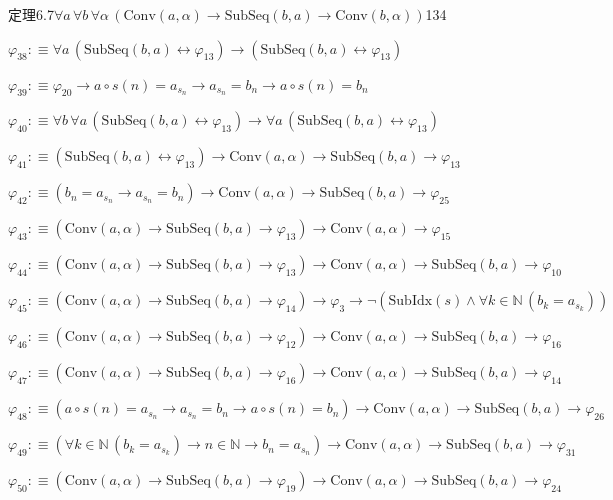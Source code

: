 \begin{fullproof}{定理6.7}{$\forall a\,\forall b\,\forall \alpha\,(\mathrm{Conv}(a,\alpha) \to \mathrm{SubSeq}(b,a) \to \mathrm{Conv}(b,\alpha))$}{134}
\begin{abbrevlist}
\item $\varphi_{38} :\equiv \forall a\,(\mathrm{SubSeq}(b,a) \leftrightarrow \varphi_{13}) \to (\mathrm{SubSeq}(b,a) \leftrightarrow \varphi_{13})$
\item $\varphi_{39} :\equiv \varphi_{20} \to a \circ s(n) = a_{s_{n}} \to a_{s_{n}} = b_{n} \to a \circ s(n) = b_{n}$
\item $\varphi_{40} :\equiv \forall b\,\forall a\,(\mathrm{SubSeq}(b,a) \leftrightarrow \varphi_{13}) \to \forall a\,(\mathrm{SubSeq}(b,a) \leftrightarrow \varphi_{13})$
\item $\varphi_{41} :\equiv (\mathrm{SubSeq}(b,a) \leftrightarrow \varphi_{13}) \to \mathrm{Conv}(a,\alpha) \to \mathrm{SubSeq}(b,a) \to \varphi_{13}$
\item $\varphi_{42} :\equiv (b_{n} = a_{s_{n}} \to a_{s_{n}} = b_{n}) \to \mathrm{Conv}(a,\alpha) \to \mathrm{SubSeq}(b,a) \to \varphi_{25}$
\item $\varphi_{43} :\equiv (\mathrm{Conv}(a,\alpha) \to \mathrm{SubSeq}(b,a) \to \varphi_{13}) \to \mathrm{Conv}(a,\alpha) \to \varphi_{15}$
\item $\varphi_{44} :\equiv (\mathrm{Conv}(a,\alpha) \to \mathrm{SubSeq}(b,a) \to \varphi_{13}) \to \mathrm{Conv}(a,\alpha) \to \mathrm{SubSeq}(b,a) \to \varphi_{10}$
\item $\varphi_{45} :\equiv (\mathrm{Conv}(a,\alpha) \to \mathrm{SubSeq}(b,a) \to \varphi_{14}) \to \varphi_{3} \to \neg (\mathrm{SubIdx}(s) \land \forall k \in \mathbb{N}\,(b_{k} = a_{s_{k}}))$
\item $\varphi_{46} :\equiv (\mathrm{Conv}(a,\alpha) \to \mathrm{SubSeq}(b,a) \to \varphi_{12}) \to \mathrm{Conv}(a,\alpha) \to \mathrm{SubSeq}(b,a) \to \varphi_{16}$
\item $\varphi_{47} :\equiv (\mathrm{Conv}(a,\alpha) \to \mathrm{SubSeq}(b,a) \to \varphi_{16}) \to \mathrm{Conv}(a,\alpha) \to \mathrm{SubSeq}(b,a) \to \varphi_{14}$
\item $\varphi_{48} :\equiv (a \circ s(n) = a_{s_{n}} \to a_{s_{n}} = b_{n} \to a \circ s(n) = b_{n}) \to \mathrm{Conv}(a,\alpha) \to \mathrm{SubSeq}(b,a) \to \varphi_{26}$
\item $\varphi_{49} :\equiv (\forall k \in \mathbb{N}\,(b_{k} = a_{s_{k}}) \to n \in \mathbb{N} \to b_{n} = a_{s_{n}}) \to \mathrm{Conv}(a,\alpha) \to \mathrm{SubSeq}(b,a) \to \varphi_{31}$
\item $\varphi_{50} :\equiv (\mathrm{Conv}(a,\alpha) \to \mathrm{SubSeq}(b,a) \to \varphi_{19}) \to \mathrm{Conv}(a,\alpha) \to \mathrm{SubSeq}(b,a) \to \varphi_{24}$

\end{abbrevlist}
\end{fullproof}
